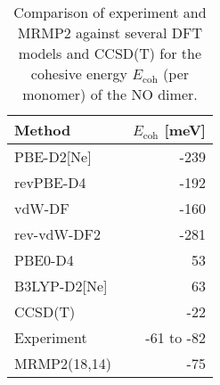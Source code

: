 \begin{table}
\caption{\label{tab:dimer_ecoh}Comparison of experiment and MRMP2 against several DFT models and CCSD(T) for the cohesive energy $E_\textrm{coh}$ (per monomer) of the NO dimer.}
\begin{adjustbox}{center}
\begin{tabular}{lr}
\toprule
Method & $E_\textrm{coh}$ [meV] \\ 
\midrule
PBE-D2[Ne] & -239 \\
revPBE-D4 & -192 \\
vdW-DF & -160 \\
rev-vdW-DF2 & -281 \\
PBE0-D4 & 53 \\
B3LYP-D2[Ne] & 63 \\
CCSD(T)~\cite{tobitaCriticalComparisonSinglereference2003} & -22 \\
Experiment~\cite{ivanicHighlevelTheoreticalStudy2012a} & -61 to -82 \\
MRMP2(18,14)~\cite{ivanicHighlevelTheoreticalStudy2012a} & -75 \\
\bottomrule
\end{tabular}
\end{adjustbox}
\end{table}